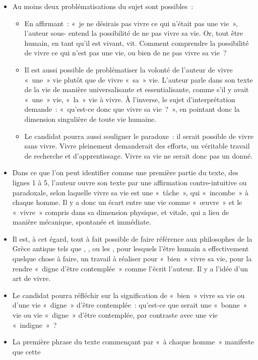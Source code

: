 {\begin{itemize}[label=\textbullet]
\item Au moins deux problématisations du sujet sont possibles~:
\begin{itemize}[label=$\circ$]
\item En affirmant~: «~je ne désirais pas vivre ce qui n'était pas une vie~», l'auteur sous-
entend la possibilité de ne pas vivre sa vie. Or, tout être humain, en tant qu'il est
vivant, vit. Comment comprendre la possibilité de vivre ce qui n'est pas une vie,
ou bien de ne pas vivre sa vie~?
\item Il est aussi possible de problématiser la volonté de l'auteur de vivre «~une~» vie
plutôt que de vivre «~sa~» vie. L'auteur parle dans son texte de la vie de manière
universalisante et essentialisante, comme s'il y avait «~une~» vie, «~la~» vie à vivre.
À l'inverse, le sujet d'interprétation demande~: «~qu'est-ce donc que vivre sa
vie~?~», en pointant donc la dimension singulière de toute vie humaine.
\item Le candidat pourra aussi souligner le paradoxe~: il serait possible de vivre sans
vivre. Vivre pleinement demanderait des efforts, un véritable travail de recherche
et d'apprentissage. Vivre sa vie ne serait donc pas un donné.
\end{itemize}
\item Dans ce que l'on peut identifier comme une première partie du texte, des lignes 1 à 5,
l'auteur ouvre son texte par une affirmation contre-intuitive ou paradoxale, selon laquelle
vivre sa vie est une «~tâche~», qui «~incombe~» à chaque homme. Il y a donc un écart entre
une vie comme «~œuvre~» et le «~vivre~» compris dans sa dimension physique, et vitale,
qui a lieu de manière mécanique, spontanée et immédiate.
\item Il est, à cet égard, tout à fait possible de faire référence aux philosophes de la Grèce
antique tels que , , ou les , pour lesquels l'être humain a
effectivement quelque chose à faire, un travail à réaliser pour «~bien~» vivre sa vie, pour
la rendre «~digne d'être contemplée~» comme l'écrit l'auteur. Il y a l'idée d'un art de vivre.
\item Le candidat pourra réfléchir sur la signification de «~bien~» vivre sa vie ou d'une vie
«~digne~» d'être contemplée~: qu'est-ce que serait une «~bonne~» vie ou vie «~digne~»
d'être contemplée, par contraste avec une vie «~indigne~»~?
\item La première phrase du texte commençant par «~à chaque homme~» manifeste que cette

\end{itemize}}
